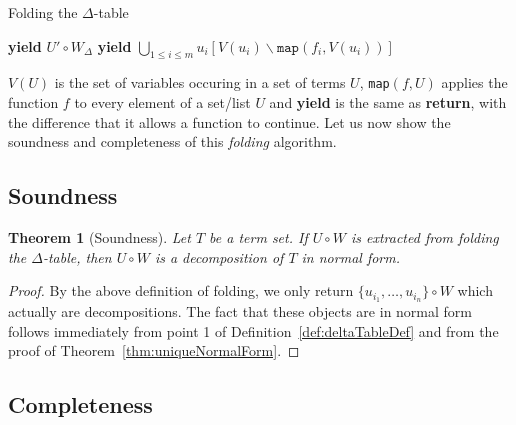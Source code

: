 \documentclass[a4paper, 11pt]{report}
\newtheorem{theorem}{Theorem}
\begin{document}
\begin{algorithm}
\caption{Folding the $\Delta$-table}
\label{alg.folding}
\begin{algorithmic}
          \State \textbf{yield} $U' \circ W_\Delta$
        \EndIf
    \EndFor
  \EndFor
\EndFunction
\State
{}
          \State \textbf{yield} $\bigcup\limits_{1 \leq i \leq m} u_i[V(u_i)\backslash \texttt{map}(f_i,V(u_i))]$
    \EndFor
\EndFunction
\end{algorithmic}
\end{algorithm}

\noindent
$V(U)$ is the set of variables occuring in a set of terms $U$, \texttt{map}$(f,U)$ applies the function $f$ to every element of a set/list $U$ and \textbf{yield} is the same as \textbf{return}, with the difference that it allows a function to continue. Let us now show the soundness and completeness of this {\em folding} algorithm.

\subsection{Soundness}

\begin{theorem}[Soundness]
\label{theo.decompositionSoundness}
Let $T$ be a term set. If $U \circ W$ is extracted from folding the $\Delta$-table, then $U \circ W$ is a decomposition of $T$ in normal form.
\end{theorem}

\begin{proof}
By the above definition of folding, we only return $\{u_{i_1},\ldots,u_{i_n}\} \circ W$ which actually are decompositions. The fact that these objects
are in normal form follows immediately from point 1 of Definition~\ref{def:deltaTableDef} and from the proof of Theorem~\ref{thm:uniqueNormalForm}.
\end{proof}

\subsection{Completeness}
\end{document}
